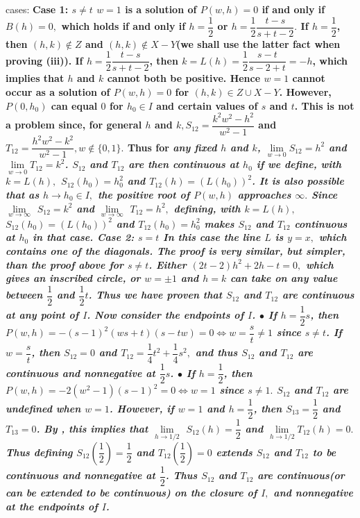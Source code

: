 cases: \newline \bf Case 1: \rm $s\neq t$ \newline $w=1$ is a solution of $P(w,h)=0$ if and only if $B(h)=0,$ which holds if and only if $h=\dfrac{1}{2}$ or $h=\dfrac{1}{2}\dfrac{t-s}{s+t-2}.$ If $h=\dfrac{1}{2}$, then $(h,k)\notin Z$ and $(h,k)\notin X-Y$(we shall use the latter fact when proving (iii)). If $h=\dfrac{1}{2}\dfrac{t-s}{s+t-2}$, then $k=L(h)=\allowbreak \dfrac{1}{2}\dfrac{s-t}{s-2+t}=-h$, which implies that $h$ and $k$ cannot both be positive. Hence $w=1$ \bf cannot \rm occur as a solution of $P(w,h)=0$ for $(h,k)\in Z\cup X-Y$. However, $P(0,h_{0})$ can equal $0$ for $h_{0}\in I$ and certain values of $s$ and $t$. This is not a problem since, for general $h$ and $k,S_{12}=\dfrac{k^{2}w^{2}-h^{2}}{w^{2}-1}$ and $T_{12}=\dfrac{h^{2}w^{2}-k^{2}}{w^{2}-1},w\notin \{0,1\}.$ Thus for \it any \rm fixed $h$ and $k$, $\lim\limits_{w\rightarrow 0}S_{12}=h^{2}$ and $\lim\limits_{w\rightarrow 0}T_{12}=\allowbreak k^{2}$. $S_{12}$ and $T_{12}$ are then continuous at $h_{0}$ if we define, with $k=L(h),$ $S_{12}(h_{0})=h_{0}^{2}$ and $T_{12}(h)=(L(h_{0}))^{2}$. It is also possible that as $h\rightarrow h_{0}\in I,$ the positive root of $P(w,h)$ approaches $\infty .$ Since $\lim\limits_{w\rightarrow \infty }$ $S_{12}=k^{2}$ and $\lim\limits_{w\rightarrow \infty }$ $T_{12}=h^{2},$ defining, with $k=L(h),$ $S_{12}(h_{0})=(L(h_{0}))^{2}$ and $T_{12}(h_{0})=h_{0}^{2}$ makes $S_{12}$ and $T_{12}$ continuous at $h_{0}$ in that case. \newline \bf Case 2: \rm $s=t$ \newline In this case the line $L$ is $y=x,$ which contains one of the diagonals. The proof is very similar, but simpler, than the proof above for $s\neq t$. Either $\allowbreak \left( 2t-2\right) h^{2}+2h-t=0,$ which gives an inscribed circle, or $w=\pm 1$ and $h=k$ can take on any value between $\dfrac{1}{2}$ and $\dfrac{1}{2}t$. \nl Thus we have proven that $S_{12}$ and $T_{12}$ are continuous at any point of $I$. Now consider the endpoints of $I$. \newline 	
$\bullet $ If $h=\dfrac{1}{2}s$, then $P(w,h)=-\left( s-1\right) ^{2}\left( ws+t\right) \left( s-tw\right) =0\Leftrightarrow w=\dfrac{s}{t}\neq 1$ since $s\neq t$. If $w=\dfrac{s}{t}$, then $S_{12}=\allowbreak 0$ and $T_{12}=\dfrac{1}{4}t^{2}+\dfrac{1}{4}s^{2},$ and thus $S_{12}$ and $T_{12}$ are continuous and nonnegative at $\dfrac{1}{2}s$. \nl 	
$\bullet $ If $h=\dfrac{1}{2}$, then $P(w,h)=-2(w^2-1)\left( s-1\right) ^{2}=0\Leftrightarrow w=1$ since $s\neq 1.$ $S_{12}$ and $T_{12}$ are undefined when $w=1$. However, if $w=1$ and $h=\dfrac{1}{2}$, then $S_{13}=\allowbreak \dfrac{1}{2}$ and $T_{13}=\allowbreak 0$. By , this implies that $\lim\limits_{h\rightarrow 1/2}$ $S_{12}(h)=\dfrac{1}{2}$ and $\lim\limits_{h\rightarrow 1/2}T_{12}(h)=0.$ \linebreak Thus defining $S_{12}\left( \dfrac{1}{2}\right) =\dfrac{1}{2}$ and $T_{12}\left( \dfrac{1}{2}\right) =0$ extends $S_{12}$ and $T_{12}$ to be continuous and nonnegative at $\dfrac{1}{2}$. \nl Thus $S_{12}$ and $T_{12}$ are continuous(or can be extended to be continuous) on the closure of $I,$ and nonnegative at the endpoints of $I$. 
